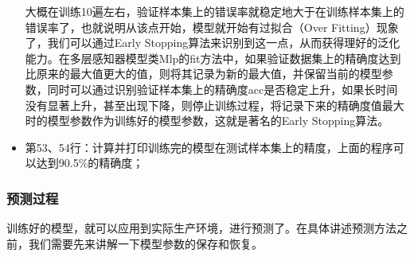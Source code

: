 \documentclass[UTF8]{article}
\begin{document}
\begin{itemize}
\begin{figure}[H]
\end{figure}
大概在训练10遍左右，验证样本集上的错误率就稳定地大于在训练样本集上的错误率了，也就说明从该点开始，模型就开始有过拟合（Over Fitting）现象了，我们可以通过Early Stopping算法来识别到这一点，从而获得理好的泛化能力。在多层感知器模型类Mlp的fit方法中，如果验证数据集上的精确度达到比原来的最大值更大的值，则将其记录为新的最大值，并保留当前的模型参数，同时可以通过识别验证样本集上的精确度acc是否稳定上升，如果长时间没有显著上升，甚至出现下降，则停止训练过程，将记录下来的精确度值最大时的模型参数作为训练好的模型参数，这就是著名的Early Stopping算法。
\item 第53、54行：计算并打印训练完的模型在测试样本集上的精度，上面的程序可以达到90.5\%的精确度；
\end{itemize}

\subsubsection{预测过程}
训练好的模型，就可以应用到实际生产环境，进行预测了。在具体讲述预测方法之前，我们需要先来讲解一下模型参数的保存和恢复。
\end{document}
